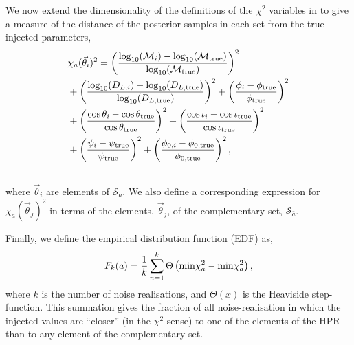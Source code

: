 \documentclass[prd,twocolumn,showpacs,nofootinbib]{revtex4}
\begin{document}
We now extend the dimensionality of the definitions of the $\chi^2$ variables in \citet{ellis-first-order} to give a measure of the distance of the posterior samples in each set from the true injected parameters,
\begin{align}
&\chi_a(\vec\theta_i)^2 = \left(\frac{\log_{10}(\mathcal{M}_i)-\log_{10}(\mathcal{M}_{\rm true})}{\log_{10}(\mathcal{M}_{\rm true})}\right)^2 \nonumber\\
&+ \left(\frac{\log_{10}(D_{L,i})-\log_{10}(D_{L,\rm true})}{\log_{10}(D_{L,\rm true})}\right)^2 + \left(\frac{\phi_i-\phi_{\rm true}}{\phi_{\rm true}}\right)^2 \nonumber\\ 
&+ \left(\frac{\cos\theta_i-\cos\theta_{\rm true}}{\cos\theta_{\rm true}}\right)^2 + \left(\frac{\cos\iota_i-\cos\iota_{\rm true}}{\cos\iota_{\rm true}}\right)^2 \nonumber\\
&+ \left(\frac{\psi_i-\psi_{\rm true}}{\psi_{\rm true}}\right)^2 + \left(\frac{\phi_{0,i}-\phi_{0,\rm true}}{\phi_{0,\rm true}}\right)^2, \\\nonumber
\end{align}
where $\vec\theta_i$ are elements of $\mathcal{S}_a$. We also define a corresponding expression for $\bar\chi_a(\vec\theta_j)^2$ in terms of the elements, $\vec\theta_j$, of the complementary set, $\mathcal{S}_{\bar a}$.

Finally, we define the empirical distribution function (EDF) as,
\begin{equation}
F_k(a) = \frac{1}{k}\sum_{n=1}^k\Theta\left({\rm min} \chi_{\bar a}^2 - {\rm min} \chi_a^2\right),
\end{equation}
where $k$ is the number of noise realisations, and $\Theta(x)$ is the Heaviside step-function. This summation gives the fraction of all noise-realisation in which the injected values are ``closer'' (in the $\chi^2$ sense) to one of the elements of the HPR than to any element of the complementary set. 
\end{document}
